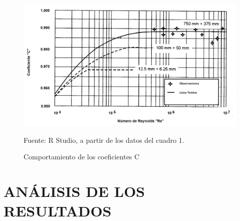 \documentclass[11pt, letterpaper]{article}
\begin{document}
\begin{figure}[H]
	\centering
	\includegraphics[width=1\columnwidth]{CD.png}
	\caption{Comportamiento de los coeficientes C}
	Fuente: R Studio, a partir de los datos del cuadro 1.
    \label{figura1}
\end{figure}

\pagebreak

\section{ANÁLISIS DE LOS RESULTADOS}
\end{document}
